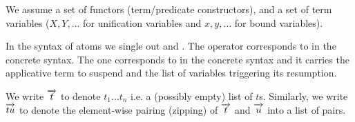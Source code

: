 \documentclass[a4paper, 11pt]{book}
\begin{document}
\newcommand{\EmptySubst}{\ensuremath{\varepsilon}}

\newcommand{\PROG}[1][]{\ensuremath{\mathcal{P}#1}\xspace}
\newcommand{\progCut}{\ensuremath{\prog[^!]}\xspace}
\newcommand{\evdash}{\ensuremath{\colondash}\xspace}
\newcommand{\piimpl}{{\ensuremath{\forall\Rightarrow}}\xspace}
\newcommand{\TYPE}[1][]{\ensuremath{\mathbb{T\!y}#1}}
\newcommand{\TERM}[1][]{\ensuremath{\mathbb{T\!m}#1}}
\newcommand{\SIGN}[1][]{\ensuremath{\mathbb{S}#1}}
\newcommand{\func}[1][]{\ensuremath{\mathcal{D}#1}}
\newcommand{\implCmd}[2]{\ensuremath{#1\ \impl\ #2}}
\newcommand{\bchain}{\ensuremath{\mathcal{B}}}
\newcommand{\cselect}{\ensuremath{\mathcal{U}}}
\newcommand{\bs}{\text{.}}
\newcommand{\piCmd}[2]{\ensuremath{\pin\ #1 \bs\ #2}}
\newcommand{\ground}{\texttt{ground}}
\newcommand{\dom}{\texttt{vars}}
\newcommand{\clauseCmd}[3]{\ensuremath{#1\ #2\ \cdash\ #3}}

We assume a set \PRED of functors (term/predicate constructors), and a set \VAR of term variables
($X,Y,\ldots$ for unification variables and $x,y,\ldots$ for bound variables).

In the syntax of atoms \ATOM we single out \cut and \cst.
The \cut operator corresponds to \elpi{!} in the concrete syntax.
The \cst one corresponds to  in the concrete syntax
and it carries the applicative term to suspend and the list of variables triggering
its resumption.


We write \(\vecL{t}\) to denote \(t_1 \ldots t_n\) i.e. a (possibly
empty) list of \(t\)s.
Similarly, we write \(\vecL{tu}\) to denote the
element-wise pairing (zipping) of \(\vecL{t}\) and \(\vecL{u}\) into a list of
pairs. %
\end{document}
